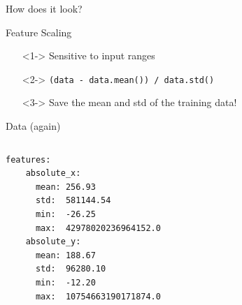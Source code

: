 \documentclass[table]{beamer}
\begin{document}
\begin{frame}{How does it look?}
\end{frame}

\begin{frame}{Feature Scaling}
  \begin{itemize}
  \item[]<1-> Sensitive to input ranges
  \item[]<2-> \texttt{(data - data.mean()) / data.std()}
  \item[]<3-> Save the mean and std of the training data!
  \end{itemize}
\end{frame}

\begin{frame}[fragile]{Data (again)}
  \begin{columns}[T]
    \begin{verbatim}
features:
    absolute_x:
      mean: 256.93
      std:  581144.54
      min:  -26.25
      max:  42978020236964152.0
    absolute_y:
      mean: 188.67
      std:  96280.10
      min:  -12.20
      max:  10754663190171874.0
    \end{verbatim}

  \end{columns}
\end{frame}
\end{document}
